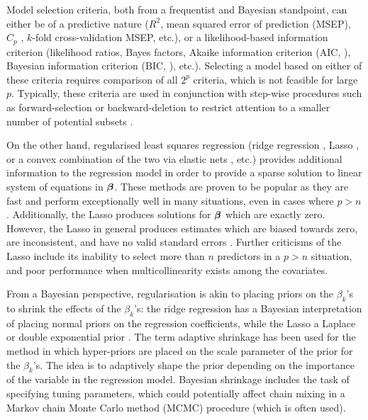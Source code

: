 \documentclass[showframe,11pt,twoside,openright]{report}
\begin{document}
Model selection criteria, both from a frequentist and Bayesian standpoint, can either be of a predictive nature ($R^2$, mean squared error of prediction (MSEP), $C_p$ \citep{mallows1973some}, $k$-fold cross-validation MSEP, etc.), or a likelihood-based information criterion (likelihood ratios, Bayes factors, Akaike information criterion (AIC, \cite{akaike1973}), Bayesian information criterion (BIC, \cite{schwarz1978estimating}), etc.).
Selecting a model based on either of these criteria requires comparison of all $2^p$ criteria, which is not feasible for large $p$.
Typically, these criteria are used in conjunction with step-wise procedures such as forward-selection or backward-deletion to restrict attention to a smaller number of potential subsets \citep{George1993,miller2002subset}.

On the other hand, regularised least squares regression (ridge regression \citep{hoerl1970ridge}, Lasso \citep{tibshirani1996regression}, or a convex combination of the two via elastic nets \citep{zou2005regularization}, etc.) provides additional information to the regression model in order to provide a sparse solution to linear system of equations in ${\bm\beta}$.
These methods are proven to be popular as they are fast and perform exceptionally well in many situations, even in cases where $p > n$.
Additionally, the Lasso produces solutions for ${\bm\beta}$ which are exactly zero.
However, the Lasso in general produces estimates which are biased towards zero, are inconsistent, and have no valid standard errors \citep{friedman2001elements,kyung2010penalized}.
Further criticisms of the Lasso include its inability to select more than $n$ predictors in a $p>n$ situation, and poor performance when multicollinearity exists among the covariates.

From a Bayesian perspective, regularisation is akin to placing priors on the $\beta_k$'s to shrink the effects of the $\beta_k$'s: the ridge regression has a Bayesian interpretation of placing normal priors on the regression coefficients, while the Lasso a Laplace or double exponential prior \citep{park2008bayesian}.
The term adaptive shrinkage has been used for the method in which hyper-priors are placed on the scale parameter of the prior for the $\beta_k$'s.
The idea is to adaptively shape the prior depending on the importance of the variable in the regression model.
Bayesian shrinkage includes the task of specifying tuning parameters, which could potentially affect chain mixing in a Markov chain Monte Carlo method (MCMC) procedure (which is often used).
\end{document}
